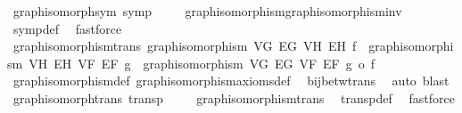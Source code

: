 \begin{isabellebody}
%
\isadelimproof
\isanewline
%
\endisadelimproof
\isanewline
{}\isamarkupfalse%
\ graph{\isacharunderscore}{\kern0pt}isomorph{\isacharunderscore}{\kern0pt}sym{\isacharcolon}{\kern0pt}\ {\isachardoublequoteopen}symp\ {\isacharparenleft}{\kern0pt}{\isasymsimeq}{\isacharparenright}{\kern0pt}{\isachardoublequoteclose}\isanewline
%
\isadelimproof
\ \ %
\endisadelimproof
%
\isatagproof
{}\isamarkupfalse%
\ graph{\isacharunderscore}{\kern0pt}isomorphism{\isachardot}{\kern0pt}graph{\isacharunderscore}{\kern0pt}isomorphism{\isacharunderscore}{\kern0pt}inv\ \isamarkupfalse%
\ symp{\isacharunderscore}{\kern0pt}def\ \isamarkupfalse%
\ fastforce%
\endisatagproof
{\isafoldproof}%
%
\isadelimproof
\isanewline
%
\endisadelimproof
\isanewline
{}\isamarkupfalse%
\ graph{\isacharunderscore}{\kern0pt}isomorphism{\isacharunderscore}{\kern0pt}trans{\isacharcolon}{\kern0pt}\ {\isachardoublequoteopen}graph{\isacharunderscore}{\kern0pt}isomorphism\ V\isactrlsub G\ E\isactrlsub G\ V\isactrlsub H\ E\isactrlsub H\ f\ {\isasymLongrightarrow}\ graph{\isacharunderscore}{\kern0pt}isomorphism\ V\isactrlsub H\ E\isactrlsub H\ V\isactrlsub F\ E\isactrlsub F\ g\ {\isasymLongrightarrow}\ graph{\isacharunderscore}{\kern0pt}isomorphism\ V\isactrlsub G\ E\isactrlsub G\ V\isactrlsub F\ E\isactrlsub F\ {\isacharparenleft}{\kern0pt}g\ o\ f{\isacharparenright}{\kern0pt}{\isachardoublequoteclose}\isanewline
%
\isadelimproof
\ \ %
\endisadelimproof
%
\isatagproof
{}\isamarkupfalse%
\ graph{\isacharunderscore}{\kern0pt}isomorphism{\isacharunderscore}{\kern0pt}def\ graph{\isacharunderscore}{\kern0pt}isomorphism{\isacharunderscore}{\kern0pt}axioms{\isacharunderscore}{\kern0pt}def\ \isamarkupfalse%
\ bij{\isacharunderscore}{\kern0pt}betw{\isacharunderscore}{\kern0pt}trans\ \isamarkupfalse%
\ {\isacharparenleft}{\kern0pt}auto{\isacharcomma}{\kern0pt}\ blast{\isacharparenright}{\kern0pt}%
\endisatagproof
{\isafoldproof}%
%
\isadelimproof
\isanewline
%
\endisadelimproof
\isanewline
{}\isamarkupfalse%
\ graph{\isacharunderscore}{\kern0pt}isomorph{\isacharunderscore}{\kern0pt}trans{\isacharcolon}{\kern0pt}\ {\isachardoublequoteopen}transp\ {\isacharparenleft}{\kern0pt}{\isasymsimeq}{\isacharparenright}{\kern0pt}{\isachardoublequoteclose}\isanewline
%
\isadelimproof
\ \ %
\endisadelimproof
%
\isatagproof
{}\isamarkupfalse%
\ graph{\isacharunderscore}{\kern0pt}isomorphism{\isacharunderscore}{\kern0pt}trans\ \isamarkupfalse%
\ transp{\isacharunderscore}{\kern0pt}def\ \isamarkupfalse%
\ fastforce%
\endisatagproof
{\isafoldproof}%
%
\isadelimproof
\isanewline
%
\endisadelimproof
%
\isadelimtheory
\isanewline
%
\endisadelimtheory
%
\isatagtheory
{}\isamarkupfalse%
%
\endisatagtheory
{\isafoldtheory}%
%
\isadelimtheory
%
\endisadelimtheory
%
\end{isabellebody}%
